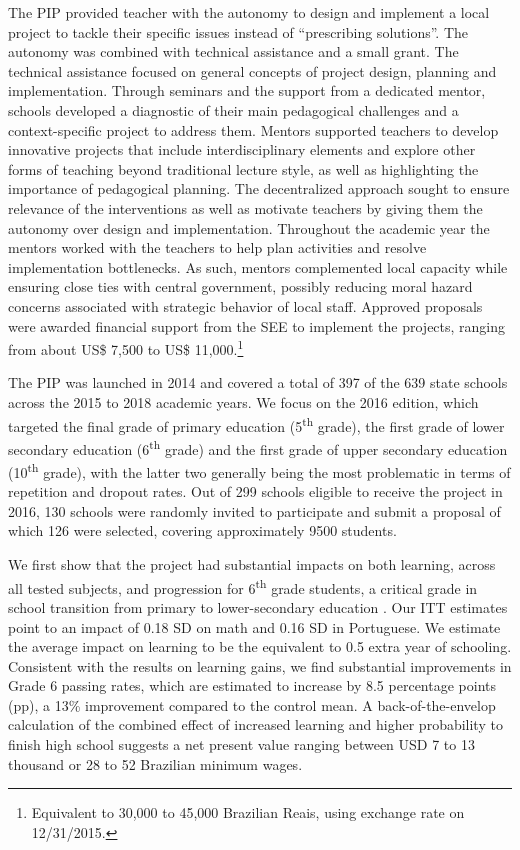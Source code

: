 \documentclass[11pt,a4paper]{article}
\begin{document}
The PIP provided teacher with the autonomy to design and implement a local project to tackle their specific issues instead of ``prescribing solutions''. The autonomy was combined with technical assistance and a small grant. The technical assistance focused on general concepts of project design, planning and implementation. Through seminars and the support from a dedicated mentor, schools developed a diagnostic of their main pedagogical challenges and a context-specific project to address them. Mentors supported teachers to develop innovative projects that include interdisciplinary elements and explore other forms of teaching beyond traditional lecture style, as well as highlighting the importance of pedagogical planning. The decentralized approach sought to ensure relevance of the interventions as well as motivate teachers by giving them the autonomy over design and implementation. Throughout the academic year the mentors worked with the teachers to help plan activities and resolve implementation bottlenecks. As such, mentors complemented local capacity while ensuring close ties with central government, possibly reducing moral hazard concerns associated with strategic behavior of local staff. Approved proposals were awarded financial support from the SEE to implement the projects, ranging from about US\$ 7,500 to US\$ 11,000.\footnote{Equivalent to 30,000 to 45,000 Brazilian Reais, using exchange rate on 12/31/2015.} 


The PIP was launched in 2014 and covered a total of 397 of the 639 state schools across the 2015 to 2018 academic years. We focus on the 2016 edition, which targeted the final grade of primary education (5\textsuperscript{th} grade), the first grade of lower secondary education (6\textsuperscript{th} grade) and the first grade of upper secondary education (10\textsuperscript{th} grade), with the latter two generally being the most problematic in terms of repetition and dropout rates. Out of 299 schools eligible to receive the project in 2016, 130 schools were randomly invited to participate and submit a proposal of which 126 were selected, covering approximately 9500 students. 


We first show that the project had substantial impacts on both learning, across all tested subjects, and progression for 6\textsuperscript{th} grade students, a critical grade in school transition from primary to lower-secondary education \citep{Santos2017}. Our ITT estimates point to an impact of 0.18 SD on math and 0.16 SD in Portuguese. We estimate the average impact on learning to be the equivalent to 0.5 extra year of schooling. Consistent with the results on learning gains, we find substantial improvements in Grade 6 passing rates, which are estimated to increase by 8.5 percentage points (pp), a 13\% improvement compared to the control mean. A back-of-the-envelop calculation of the combined effect of increased learning and higher probability to finish high school suggests a net present value ranging between USD 7 to 13 thousand or 28 to 52 Brazilian minimum wages.
\end{document}
